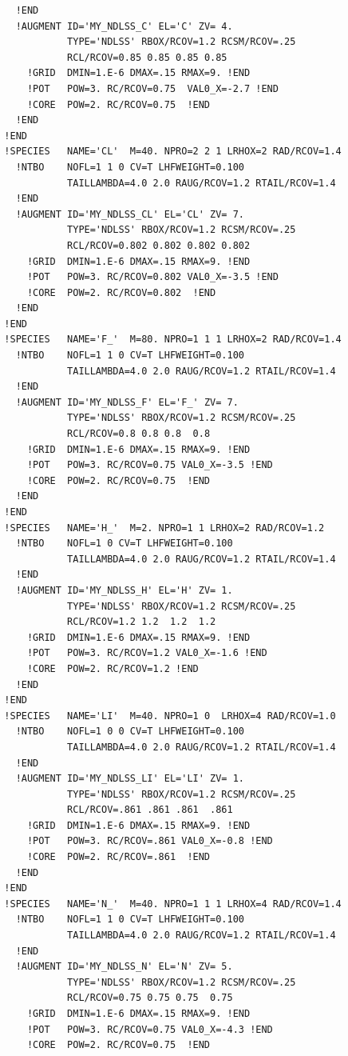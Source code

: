 \documentclass{book}
\begin{document}
{\begin{verbatim}
    !END 
    !AUGMENT ID='MY_NDLSS_C' EL='C' ZV= 4.
             TYPE='NDLSS' RBOX/RCOV=1.2 RCSM/RCOV=.25
             RCL/RCOV=0.85 0.85 0.85 0.85 
      !GRID  DMIN=1.E-6 DMAX=.15 RMAX=9. !END
      !POT   POW=3. RC/RCOV=0.75  VAL0_X=-2.7 !END
      !CORE  POW=2. RC/RCOV=0.75  !END
    !END
  !END
  !SPECIES   NAME='CL'  M=40. NPRO=2 2 1 LRHOX=2 RAD/RCOV=1.4
    !NTBO    NOFL=1 1 0 CV=T LHFWEIGHT=0.100
             TAILLAMBDA=4.0 2.0 RAUG/RCOV=1.2 RTAIL/RCOV=1.4 
    !END 
    !AUGMENT ID='MY_NDLSS_CL' EL='CL' ZV= 7.
             TYPE='NDLSS' RBOX/RCOV=1.2 RCSM/RCOV=.25
             RCL/RCOV=0.802 0.802 0.802 0.802 
      !GRID  DMIN=1.E-6 DMAX=.15 RMAX=9. !END
      !POT   POW=3. RC/RCOV=0.802 VAL0_X=-3.5 !END
      !CORE  POW=2. RC/RCOV=0.802  !END
    !END
  !END
  !SPECIES   NAME='F_'  M=80. NPRO=1 1 1 LRHOX=2 RAD/RCOV=1.4
    !NTBO    NOFL=1 1 0 CV=T LHFWEIGHT=0.100
             TAILLAMBDA=4.0 2.0 RAUG/RCOV=1.2 RTAIL/RCOV=1.4 
    !END 
    !AUGMENT ID='MY_NDLSS_F' EL='F_' ZV= 7.
             TYPE='NDLSS' RBOX/RCOV=1.2 RCSM/RCOV=.25
             RCL/RCOV=0.8 0.8 0.8  0.8 
      !GRID  DMIN=1.E-6 DMAX=.15 RMAX=9. !END
      !POT   POW=3. RC/RCOV=0.75 VAL0_X=-3.5 !END
      !CORE  POW=2. RC/RCOV=0.75  !END
    !END
  !END
  !SPECIES   NAME='H_'  M=2. NPRO=1 1 LRHOX=2 RAD/RCOV=1.2
    !NTBO    NOFL=1 0 CV=T LHFWEIGHT=0.100
             TAILLAMBDA=4.0 2.0 RAUG/RCOV=1.2 RTAIL/RCOV=1.4 
    !END 
    !AUGMENT ID='MY_NDLSS_H' EL='H' ZV= 1.
             TYPE='NDLSS' RBOX/RCOV=1.2 RCSM/RCOV=.25
             RCL/RCOV=1.2 1.2  1.2  1.2 
      !GRID  DMIN=1.E-6 DMAX=.15 RMAX=9. !END
      !POT   POW=3. RC/RCOV=1.2 VAL0_X=-1.6 !END
      !CORE  POW=2. RC/RCOV=1.2 !END
    !END
  !END
  !SPECIES   NAME='LI'  M=40. NPRO=1 0  LRHOX=4 RAD/RCOV=1.0
    !NTBO    NOFL=1 0 0 CV=T LHFWEIGHT=0.100
             TAILLAMBDA=4.0 2.0 RAUG/RCOV=1.2 RTAIL/RCOV=1.4 
    !END 
    !AUGMENT ID='MY_NDLSS_LI' EL='LI' ZV= 1.
             TYPE='NDLSS' RBOX/RCOV=1.2 RCSM/RCOV=.25
             RCL/RCOV=.861 .861 .861  .861 
      !GRID  DMIN=1.E-6 DMAX=.15 RMAX=9. !END
      !POT   POW=3. RC/RCOV=.861 VAL0_X=-0.8 !END
      !CORE  POW=2. RC/RCOV=.861  !END
    !END
  !END
  !SPECIES   NAME='N_'  M=40. NPRO=1 1 1 LRHOX=4 RAD/RCOV=1.4
    !NTBO    NOFL=1 1 0 CV=T LHFWEIGHT=0.100
             TAILLAMBDA=4.0 2.0 RAUG/RCOV=1.2 RTAIL/RCOV=1.4 
    !END 
    !AUGMENT ID='MY_NDLSS_N' EL='N' ZV= 5.
             TYPE='NDLSS' RBOX/RCOV=1.2 RCSM/RCOV=.25
             RCL/RCOV=0.75 0.75 0.75  0.75
      !GRID  DMIN=1.E-6 DMAX=.15 RMAX=9. !END
      !POT   POW=3. RC/RCOV=0.75 VAL0_X=-4.3 !END
      !CORE  POW=2. RC/RCOV=0.75  !END

\end{verbatim}}
\end{document}
